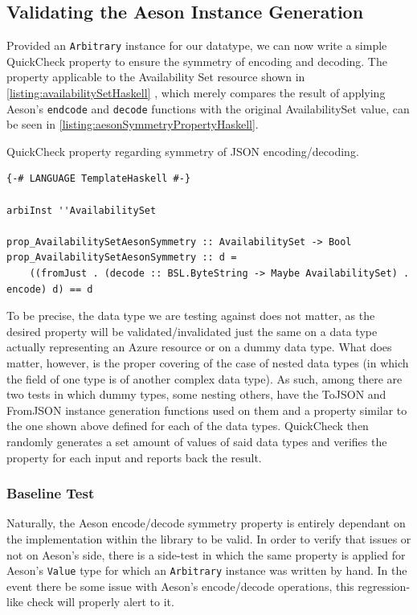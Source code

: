 \documentclass[11pt]{report}
\begin{document}
\subsection{Validating the Aeson Instance Generation}

Provided an \texttt{Arbitrary} instance for our datatype, we can now write a
simple QuickCheck property to ensure the symmetry of encoding and decoding. The
property applicable to the Availability Set resource shown in
\autoref{listing:availabilitySetHaskell} , which merely compares the result
of applying Aeson's \texttt{endcode} and \texttt{decode} functions with the
original AvailabilitySet value, can be seen in
\autoref{listing:aesonSymmetryPropertyHaskell}.

\begin{listing}[H]
\caption{QuickCheck property regarding symmetry of JSON encoding/decoding.}
\label{listing:aesonSymmetryPropertyHaskell}
\begin{verbatim}
{-# LANGUAGE TemplateHaskell #-}

arbiInst ''AvailabilitySet

prop_AvailabilitySetAesonSymmetry :: AvailabilitySet -> Bool
prop_AvailabilitySetAesonSymmetry :: d =
    ((fromJust . (decode :: BSL.ByteString -> Maybe AvailabilitySet) . encode) d) == d
\end{verbatim}
\end{listing}

To be precise, the data type we are testing against does not matter, as the
desired property will be validated/invalidated just the same on a data type
actually representing an Azure resource or on a dummy data type. What does
matter, however, is the proper covering of the case of nested data types (in
which the field of one type is of another complex data type). As such, among
there are two tests in which dummy types, some nesting others, have
the ToJSON and FromJSON instance generation functions used on them and a
property similar to the one shown above defined for each of the data types.
QuickCheck then randomly generates a set amount of values of said data types
and verifies the property for each input and reports back the result.

\subsubsection{Baseline Test}

Naturally, the Aeson encode/decode symmetry property is entirely dependant on
the implementation within the library to be valid. In order to verify that
issues or not on Aeson's side, there is a side-test in which the same property
is applied for Aeson's \texttt{Value} type for which an \texttt{Arbitrary}
instance was written by hand. In the event there be some issue with Aeson's
encode/decode operations, this regression-like check will properly alert to it.
\end{document}

